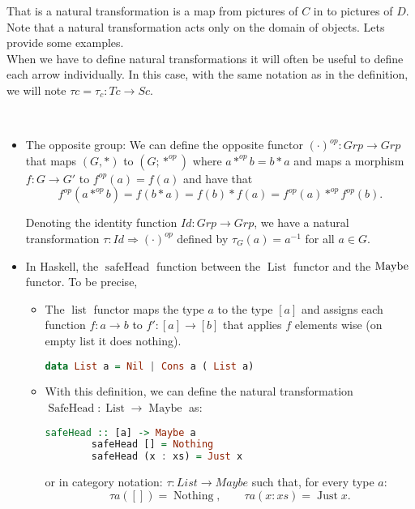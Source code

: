 That is a natural transformation is a map from pictures of $C$ in to pictures of $D$. Note that a natural transformation acts only on the domain of objects. Lets provide some examples.\\

When we have to define natural transformations  it will often be useful to define each arrow individually. In this case, with the same notation as in the definition,  we will note $\tau c = \tau_c: Tc \to Sc$. 

\begin{example}\ 
  \begin{itemize}
  \item The opposite group: We can define the opposite functor $(\cdot)^{op}: Grp \to Grp$ that maps $(G, *)$ to $(G; *^{op})$ where $a*^{op}b= b*a$ and maps a morphism $f: G \to G'$ to $f^{op}(a) = f(a)$ and have that
    $$ f^{op}(a*^{op}b) = f(b*a) = f(b)*f(a) = f^{op}(a) *^{op} f^{op}(b).$$

    Denoting the identity function $Id:Grp\to Grp$, we have a natural transformation $\tau:Id \Rightarrow (\cdot)^{op}$ defined by $\tau_G(a)=a^{-1}$ for all $a\in G$.
    
  \item In Haskell, the $\operatorname{safeHead}$ \cite[Section 10.1]{milewski2018category} function between the $\operatorname{List}$ functor and the $\operatorname{Maybe}$ functor. To be precise, 
    \begin{itemize}
    \item The $\operatorname{list}$ functor maps the type $a$ to the type $[a]$ and assigns each function $f:a\to b$ to $f':[a]\to [b]$ that applies $f$ elements wise (on empty list it does nothing).
      \begin{lstlisting}[language=Haskell,captionpos=b]
        data List a = Nil | Cons a ( List a)
      \end{lstlisting}
    \item  With this definition, we can define the natural transformation $\operatorname{SafeHead}: \operatorname{List} \to \operatorname{Maybe}$ as:
      \begin{lstlisting}[language=Haskell,captionpos=b]
        safeHead :: [a] -> Maybe a
        safeHead [] = Nothing
        safeHead (x : xs) = Just x
      \end{lstlisting}

      or in category notation:  $\tau : List \to Maybe$ such that, for every type $a$:
      $$\tau a ([]) = \operatorname{Nothing}, \qquad \tau a (x:xs) = \operatorname{Just} x.$$ 
    \end{itemize}
  \end{itemize}
\end{example}


